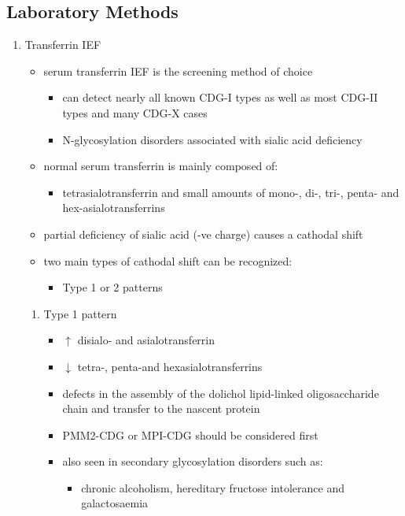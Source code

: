 \documentclass{scrartcl}
\begin{document}
\subsection{Laboratory Methods}
\label{sec:org088b1e8}
\begin{enumerate}
\item Transferrin IEF
\label{sec:org1758999}
\begin{itemize}
\item serum transferrin IEF is the screening method of choice
\begin{itemize}
\item can detect nearly all known CDG-I types as well as most CDG-II types and many CDG-X cases
\item N-glycosylation disorders associated with sialic acid deficiency
\end{itemize}
\item normal serum transferrin is mainly composed of:
\begin{itemize}
\item tetrasialotransferrin and small amounts of mono-, di-, tri-,
penta- and hex-asialotransferrins
\end{itemize}
\item partial deficiency of sialic acid (-ve charge) causes a
cathodal shift
\item two main types of cathodal shift can be recognized:
\begin{itemize}
\item Type 1 or 2 patterns
\end{itemize}
\end{itemize}
\begin{enumerate}
\item Type 1 pattern
\label{sec:org5f00ce0}
\begin{itemize}
\item \(\uparrow\) disialo- and asialotransferrin
\item \(\downarrow\)  tetra-, penta-and hexasialotransferrins
\item defects in the assembly of the dolichol lipid-linked
oligosaccharide chain and transfer to the nascent protein
\item PMM2-CDG or MPI-CDG should be considered first
\item also seen in secondary glycosylation disorders such as:
\begin{itemize}
\item chronic alcoholism, hereditary fructose intolerance and galactosaemia
\end{itemize}
\end{itemize}


\end{enumerate}
\end{enumerate}
\end{document}

